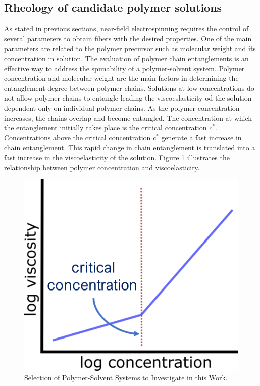 \subsection{Rheology of candidate polymer solutions}
As stated in previous sections, near-field electrospinning requires the control of several parameters to obtain fibers with the desired properties. One of the main parameters are related to the polymer precursor such as molecular weight and its concentration in solution. The evaluation of polymer chain entanglements is an effective way to address the spunability of a polymer-solvent system. \cite{Shenoy2005} Polymer concentration and molecular weight are the main factors in determining the entanglement degree between polymer chains. Solutions at low concentrations do not allow polymer chains to entangle leading the viscoeslasticity od the solution dependent only on individual polymer chains. As the polymer concentration increases, the chains overlap and become entangled. The concentration at which the entanglement initially takes place is the critical concentration $c^*$. Concentrations above the critical concentration $c^*$ generate a fast increase in chain entanglement. This rapid change in chain entanglement is translated into a fast increase in the viscoelasticity of the solution. Figure \ref{fig:concentrationViscosityPlotExplained} illustrates the relationship between polymer concentration and viscoelasticity. \cite{Burghelea2020, Gupta2005}

\begin{figure}[!th]
\centering
\includegraphics[scale=0.45]{./Figures/concentrationViscosityPlotExplained.png}
\decoRule
\caption[Selection of Polymer-Solvent Systems to Investigate in this Work]{Selection of Polymer-Solvent Systems to Investigate in this Work. \cite{Burghelea2020, Gupta2005, Han2019}}
\label{fig:concentrationViscosityPlotExplained}
\end{figure}

